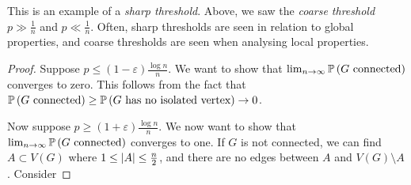 \begin{remark}
	This is an example of a \emph{sharp threshold}.
	Above, we saw the \emph{coarse threshold} \( p \gg \frac 1 n \) and \( p \ll \frac 1 n \).
	Often, sharp thresholds are seen in relation to global properties, and coarse thresholds are seen when analysing local properties.
\end{remark}
\begin{proof}
	Suppose \( p \leq (1-\varepsilon) \frac{\log n}{n} \).
	We want to show that \( \lim_{n \to \infty} \mathbb{P}\left({G \text{ connected}}\right) \) converges to zero.
	This follows from the fact that \( \mathbb{P}\left({G \text{ connected}}\right) \geq \mathbb{P}\left({G \text{ has no isolated vertex}}\right) \to 0 \).

	Now suppose \( p \geq (1 + \varepsilon) \frac{\log n}{n} \).
	We now want to show that \( \lim_{n \to \infty} \mathbb{P}\left({G \text{ connected}}\right) \) converges to one.
	If \( G \) is not connected, we can find \( A \subset V(G) \) where \( 1 \leq \abs{A} \leq \frac{n}{2} \), and there are no edges between \( A \) and \( V(G) \setminus A \).
	Consider


\end{proof}
